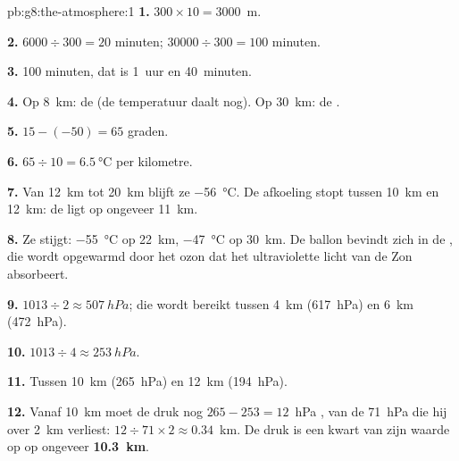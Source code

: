 \begin{solution}{pb:g8:the-atmosphere:1}
\textbf{1.} $300 \times 10 = 3000$~m.

\textbf{2.} $6000 \div 300 = 20$ minuten; $\num{30000} \div 300 = 100$
minuten.

\textbf{3.} 100 minuten, dat is 1~uur en 40~minuten.

\textbf{4.} Op \qty{8}{km}: de  (de temperatuur daalt nog). Op
\qty{30}{km}: de .

\textbf{5.} $15 - (-50) = 65$ graden.

\textbf{6.} $65 \div 10 = \qty{6.5}{\degreeCelsius}$ per kilometre.

\textbf{7.} Van \qty{12}{km} tot \qty{20}{km} blijft ze
\qty{-56}{\degreeCelsius}. De afkoeling stopt tussen \qty{10}{km} en
\qty{12}{km}: de  ligt op ongeveer \qty{11}{km}.

\textbf{8.} Ze stijgt: \qty{-55}{\degreeCelsius} op \qty{22}{km},
\qty{-47}{\degreeCelsius} op \qty{30}{km}. De ballon bevindt zich in de
, die wordt opgewarmd door het ozon dat het ultraviolette licht
van de Zon absorbeert.

\textbf{9.} $1013 \div 2 \approx \qty{507}{hPa}$; die wordt bereikt tussen
\qty{4}{km} (\qty{617}{hPa}) en \qty{6}{km} (\qty{472}{hPa}).

\textbf{10.} $1013 \div 4 \approx \qty{253}{hPa}$.

\textbf{11.} Tussen \qty{10}{km} (\qty{265}{hPa}) en \qty{12}{km}
(\qty{194}{hPa}).

\textbf{12.} Vanaf \qty{10}{km} moet de druk nog $265 - 253 =
12$~hPa , van de 71~hPa die hij over 2~km verliest: $12 \div 71 \times 2
\approx 0.34$~km. De druk is een kwart van zijn waarde op  op
ongeveer \textbf{\qty{10.3}{km}}.
\end{solution}
